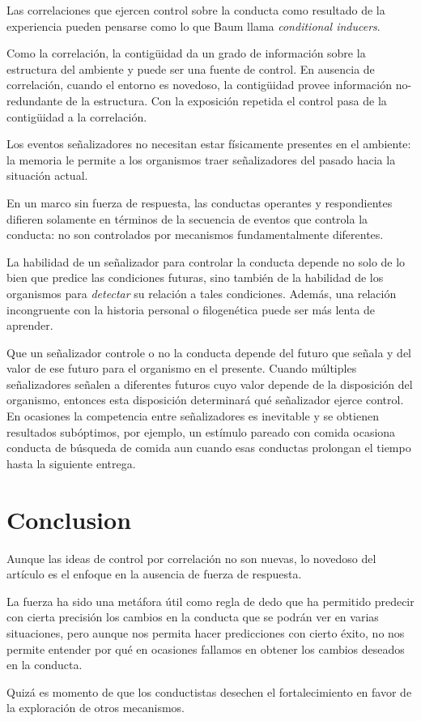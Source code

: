 \documentclass[a4paper,12pt]{article}
\begin{document}
Las correlaciones que ejercen control sobre la conducta como resultado de la experiencia pueden pensarse como lo que Baum llama {\itshape conditional inducers}.

Como la correlación, la contigüidad da un grado de información sobre la estructura del ambiente y puede ser una fuente de control. En ausencia de correlación, cuando el entorno es novedoso, la contigüidad provee información no-redundante de la estructura. Con la exposición repetida el control pasa de la contigüidad a la correlación.

Los eventos señalizadores no necesitan estar físicamente presentes en el ambiente: la memoria le permite a los organismos traer señalizadores del pasado hacia la situación actual.

En un marco sin fuerza de respuesta, las conductas operantes y respondientes difieren solamente en términos de la secuencia de eventos que controla la conducta: no son controlados por mecanismos fundamentalmente diferentes.

La habilidad de un señalizador para controlar la conducta depende no solo de lo bien que predice las condiciones futuras, sino también de la habilidad de los organismos para {\itshape detectar} su relación a tales condiciones. Además, una relación incongruente con la historia personal o filogenética puede ser más lenta de aprender.

Que un señalizador controle o no la conducta depende del futuro que señala y del valor de ese futuro para el organismo en el presente. Cuando múltiples señalizadores señalen a diferentes futuros cuyo valor depende de la disposición del organismo, entonces esta disposición determinará qué señalizador ejerce control. En ocasiones la competencia entre señalizadores es inevitable y se obtienen resultados subóptimos, por ejemplo, un estímulo pareado con comida ocasiona conducta de búsqueda de comida aun cuando esas conductas prolongan el tiempo hasta la siguiente entrega.

\section{Conclusion}

Aunque las ideas de control por correlación no son nuevas, lo novedoso del artículo es el enfoque en la ausencia de fuerza de respuesta.

La fuerza ha sido una metáfora útil como regla de dedo que ha permitido predecir con cierta precisión los cambios en la conducta que se podrán ver en varias situaciones, pero aunque nos permita hacer predicciones con cierto éxito, no nos permite entender por qué en ocasiones fallamos en obtener los cambios deseados en la conducta.

Quizá es momento de que los conductistas desechen el fortalecimiento en favor de la exploración de otros mecanismos.
\end{document}

